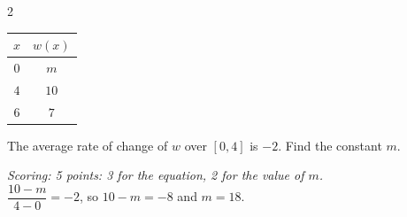 \begin{multicols}{2}
\begin{minipage}{\linewidth}
\begin{exo}{}
\begin{center}\begin{tabular}{|c|c|}\hline$x$&$w(x)$\\\hline$0$&$m$\\\hline$4$&$10$\\\hline$6$&$7$\\\hline\end{tabular}\end{center}
The average rate of change of $w$ over $[0,4]$ is $-2$. Find the constant $m$.
\ifkey\else\vspace{1.4cm}\fi
\begin{solution}
\textit{Scoring: 5 points: 3 for the equation, 2 for the value of $m$.}\\
$\dfrac{10-m}{4-0}=-2$, so $10-m=-8$ and $m=18$.
\end{solution}
\end{exo}
\end{minipage}\par\vspace{8pt}

\end{multicols}

